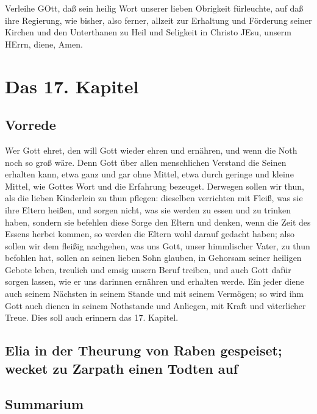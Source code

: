 Verleihe GOtt, daß sein heilig Wort unserer lieben Obrigkeit fürleuchte, auf daß ihre Regierung, wie bisher, also ferner, allzeit zur Erhaltung und Förderung seiner Kirchen und den Unterthanen zu Heil und Seligkeit in Christo JEsu, unserm HErrn, diene, Amen.

\chapter{Das 17. Kapitel}

\section{Vorrede}

Wer Gott ehret, den will Gott wieder ehren und ernähren, und wenn die Noth noch so groß wäre. Denn Gott über allen menschlichen Verstand die Seinen erhalten kann, etwa ganz und gar ohne Mittel, etwa durch geringe und kleine Mittel, wie Gottes Wort und die Erfahrung bezeuget. Derwegen sollen wir thun, als die lieben Kinderlein zu thun pflegen: dieselben verrichten mit Fleiß, was sie ihre Eltern heißen, und sorgen nicht, was sie werden zu essen und zu trinken haben, sondern sie befehlen diese Sorge den Eltern und denken, wenn die Zeit des Essens herbei kommen, so werden die Eltern wohl darauf gedacht haben; also sollen wir dem fleißig nachgehen, was uns Gott, unser himmlischer Vater, zu thun befohlen hat, sollen an seinen lieben Sohn glauben, in Gehorsam seiner heiligen Gebote leben, treulich und emsig unsern Beruf treiben, und auch Gott dafür sorgen lassen, wie er uns darinnen ernähren und erhalten werde. Ein jeder diene auch seinem Nächsten in seinem Stande und mit seinem Vermögen; so wird ihm Gott auch dienen in seinem Nothstande und Anliegen, mit Kraft und väterlicher Treue. Dies soll auch erinnern das 17. Kapitel.

\section[Elia in der Theurung von Raben gespeiset; wecket]{Elia in der Theurung von Raben gespeiset; wecket zu Zarpath einen Todten auf}

\section{Summarium}

